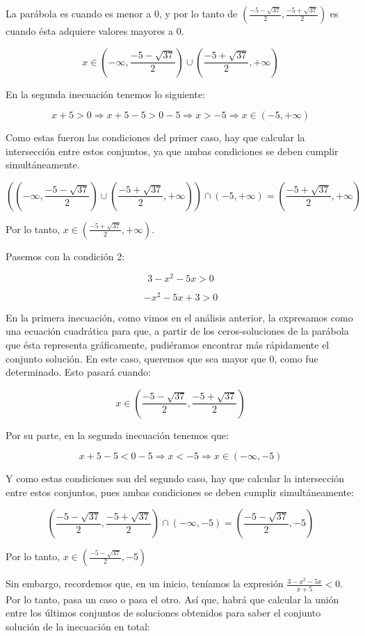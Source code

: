 \documentclass{article}
\begin{document}
\begin{enumerate}
La parábola es cuando es menor a 0, y por lo tanto de $\left(\frac{-5-\sqrt{37}}{2},\frac{-5+\sqrt{37}}{2}\right)$ es cuando ésta adquiere valores mayores a 0.

\[ x \in (-\infty, \frac{-5-\sqrt{37}}{2}) \cup (\frac{-5+\sqrt{37}}{2}, +\infty) \]

En la segunda inecuación tenemos lo siguiente:

\[ x + 5 > 0 \Rightarrow x + 5 - 5 > 0 - 5 \Rightarrow x > -5 \Rightarrow x \in (-5, +\infty) \]

Como estas fueron las condiciones del primer caso, hay que calcular la intersección entre estos conjuntos, ya que ambas condiciones se deben cumplir simultáneamente.

\[ \left( (-\infty, \frac{-5-\sqrt{37}}{2}) \cup (\frac{-5+\sqrt{37}}{2}, +\infty) \right) \cap (-5, +\infty) = \left( \frac{-5+\sqrt{37}}{2}, +\infty \right) \]

Por lo tanto, \( x \in \left( \frac{-5+\sqrt{37}}{2}, +\infty \right) \).

Pasemos con la condición 2:

\[ 3 - x^2 - 5x > 0 \]

\[ -x^2 - 5x + 3 > 0 \]

En la primera inecuación, como vimos en el análisis anterior, la expresamos como una ecuación cuadrática para que, a partir de los ceros-soluciones de la parábola que ésta representa gráficamente, pudiéramos encontrar más rápidamente el conjunto solución. En este caso, queremos que sea mayor que 0, como fue determinado. Esto pasará cuando:

\[ x \in \left( \frac{-5-\sqrt{37}}{2}, \frac{-5+\sqrt{37}}{2} \right) \]

Por su parte, en la segunda inecuación tenemos que:

\[ x + 5 - 5 < 0 - 5 \Rightarrow x < -5 \Rightarrow x \in (-\infty, -5) \]

Y como estas condiciones son del segundo caso, hay que calcular la intersección entre estos conjuntos, pues ambas condiciones se deben cumplir simultáneamente:

\[ \left( \frac{-5-\sqrt{37}}{2}, \frac{-5+\sqrt{37}}{2} \right) \cap (-\infty, -5) = \left( \frac{-5-\sqrt{37}}{2}, -5 \right) \]

Por lo tanto, \( x \in \left( \frac{-5-\sqrt{37}}{2}, -5 \right) \)

Sin embargo, recordemos que, en un inicio, teníamos la expresión \( \frac{3 - x^2 - 5x}{x + 5} < 0 \). Por lo tanto, pasa un caso o pasa el otro. Así que, habrá que calcular la unión entre los últimos conjuntos de soluciones obtenidos para saber el conjunto solución de la inecuación en total:


\end{enumerate}
\end{document}
